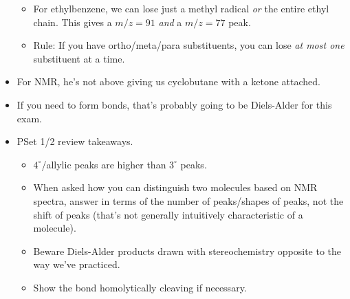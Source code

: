 \documentclass[../notes.tex]{subfiles}
\begin{document}
\begin{itemize}
\begin{itemize}
        \item For ethylbenzene, we can lose just a methyl radical \emph{or} the entire ethyl chain. This gives a $m/z=91$ \emph{and} a $m/z=77$ peak.
        \item Rule: If you have ortho/meta/para substituents, you can lose \emph{at most one} substituent at a time.
    \end{itemize}
    \item For  NMR, he's not above giving us cyclobutane with a ketone attached.
    \item If you need to form  bonds, that's probably going to be Diels-Alder for this exam.
    \item {}PSet 1/2 review takeaways.
    \begin{itemize}
        \item $4^\circ$/allylic  peaks are higher than $3^\circ$ peaks.
        \item When asked how you can distinguish two molecules based on NMR spectra, answer in terms of the number of peaks/shapes of peaks, not the shift of peaks (that's not generally intuitively characteristic of a molecule).
        \item Beware Diels-Alder products drawn with stereochemistry opposite to the way we've practiced.
        \item Show the  bond homolytically cleaving if necessary.
    \end{itemize}
\end{itemize}
\end{document}
